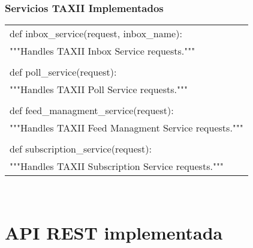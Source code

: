 \subsection{Servicios TAXII Implementados}
	
	\begin{center}
		\begin{tabular}{|l|}
			\hline
			def inbox\_service(request, inbox\_name): \\
			"""Handles TAXII Inbox Service requests.""" \\ \\
			
			def poll\_service(request):\ \\
			"""Handles TAXII Poll Service requests.""" \\ \\
			
			def feed\_managment\_service(request): \\
			"""Handles TAXII Feed Managment Service requests.""" \\ \\
			
			def subscription\_service(request):\ \\
			"""Handles TAXII Subscription Service requests.""" \\
			\hline
		\end{tabular}
	\end{center}\ \\

\chapter{API REST implementada}

